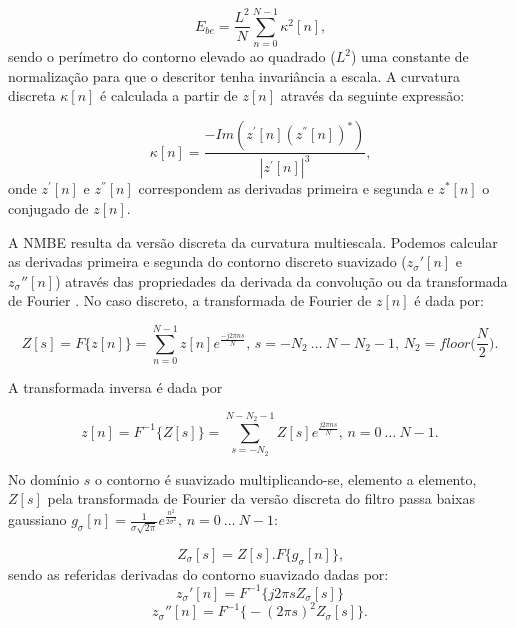 \begin{equation}
E_{be} = \frac{L^{2}}{N}\sum_{n=0}^{N-1}\kappa^{2}[n]\text{,}
\label{eq:ebe}
\end{equation}
\noindent
sendo o perímetro do contorno elevado ao quadrado ($L^2$) uma constante de normalização para que o descritor tenha invariância a escala. A curvatura discreta $\kappa[n]$ é calculada a partir de $z[n]$ através da seguinte expressão:

\begin{equation}
\kappa[n] = \frac{-Im(z^{'}[n](z^{''}[n])^{*})}{|z^{'}[n]|^3} \text{,}
\label{eq:kn}
\end{equation}
\noindent
onde $z^{'}[n]$ e $z^{''}[n]$ correspondem as derivadas primeira e segunda e $z^{*}[n]$ o conjugado de $z[n]$. 

A \ac{NMBE} resulta da versão discreta da curvatura multiescala. Podemos calcular as derivadas primeira e segunda do contorno discreto suavizado ($z_\sigma'[n]$ e $z_\sigma''[n]$) através das propriedades da derivada da convolução ou da transformada de Fourier \cite{Costa:1997}. No caso discreto, a transformada de Fourier de $z[n]$ é dada por:  

\begin{equation}
Z[s] = F\big\{z[n]\big\} = \sum\limits_{n=0}^{N-1}z[n]e^{\frac{-j2\pi ns}{N}} \text{, }s = -N_{2}\: \ldots \: N-N_{2}-1\text{, }N_{2}=floor\big(\frac{N}{2}\big)\text{.}
\end{equation}

A transformada inversa é dada por  

\begin{equation}
z[n] = F^{-1}\big\{Z[s]\big\} = \sum\limits_{s = -N_{2}}^{N-N_{2}-1}Z[s]e^{\frac{j2\pi n s}{N}}\text{, }n = 0\: \ldots \: N-1\text{.}
\end{equation}

No domínio $s$ o contorno é suavizado multiplicando-se, elemento a elemento, $Z[s]$ pela transformada de Fourier da versão discreta do filtro passa baixas gaussiano $g_\sigma[n] = \frac{1}{\sigma\sqrt{2\pi}}e^{\frac{n^2}{2\sigma^2}}\text{, } 
n = 0 \: \ldots \: N-1$:

\begin{equation}
Z_\sigma[s] = Z[s].F\big\{g_\sigma[n]\big\}\text{,}
\end{equation}
\noindent
sendo as referidas derivadas do contorno suavizado dadas por:
\begin{equation}
z_\sigma'[n] = F^{-1}\big\{j2\pi s Z_\sigma[s]\big\}
\end{equation}
\begin{equation}
z_\sigma''[n] = F^{-1}\big\{-(2\pi s)^2 Z_\sigma[s]\big\}\text{.}
\end{equation}

